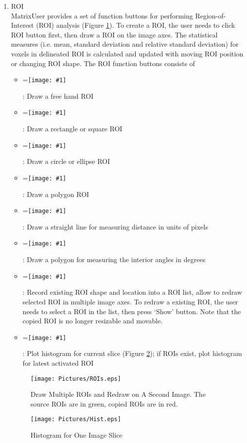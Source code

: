 \documentclass{article}%
\newcommand{\vcenteredinclude}[1]{
\begingroup
\setbox0=\hbox{\texttt{[image: \#1]}}
\parbox{\wd0}{\box0}\endgroup}
\begin{document}
\begin{enumerate}
\begin{itemize}
	\end{itemize}
	
	
	\item ROI \\
	
MatrixUser provides a set of function buttons for performing Region-of-Interest (ROI) analysis (Figure \ref{fig:ROIs}). To create a ROI, the user needs to click ROI button first, then draw a ROI on the image axes. The statistical measures (i.e. mean, standard deviation and relative standard deviation) for voxels in delineated ROI is calculated and updated with moving ROI position or changing ROI shape. The ROI function buttons consists of

	\begin{itemize}
		\item \vcenteredinclude{Pictures/FreeROI.eps} : Draw a free hand ROI
		\item \vcenteredinclude{Pictures/RectangleROI.eps} : Draw a rectangle or square ROI
		\item \vcenteredinclude{Pictures/CircleROI.eps} : Draw a circle or ellipse ROI
		\item \vcenteredinclude{Pictures/PolygonROI.eps} : Draw a polygon ROI
		\item \vcenteredinclude{Pictures/LineROI.eps} : Draw a straight line for measuring distance in units of pixels
		\item \vcenteredinclude{Pictures/AngleROI.eps} : Draw a polygon for measuring the interior angles in degrees
		\item \vcenteredinclude{Pictures/ROIManager.eps} : Record existing ROI shape and location into a ROI list, allow to redraw selected ROI in multiple image axes. To redraw a existing ROI, the user needs to select a ROI in the list, then press `Show' button. Note that the copied ROI is no longer resizable and movable.
		\item \vcenteredinclude{Pictures/Histogram.eps} : Plot histogram for current slice (Figure \ref{fig:Hist}); if ROIs exist, plot histogram for latest activated ROI
	\end{itemize}
	
	\begin{figure}[htbp]
		\centering
			\texttt{[image: Pictures/ROIs.eps]}
		\caption{Draw Multiple ROIs and Redraw on A Second Image. The source ROIs are in green, copied ROIs are in red.}
		\label{fig:ROIs}
	\end{figure}
	
	
	\begin{figure}[htbp]
		\centering
			\texttt{[image: Pictures/Hist.eps]}
		\caption{Histogram for One Image Slice}
		\label{fig:Hist}
	\end{figure}
	

\end{enumerate}
\end{document}
